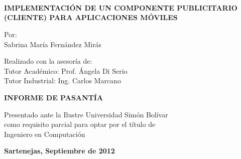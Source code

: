 \begin{center}
\par\end{center}

\noindent \begin{center}
\textbf{}\textbf{\noun{}}\\
\textbf{}\\
\textbf{}\noun{}\\
\bigskip{}
\bigskip{}
\bigskip{}
\bigskip{}
\bigskip{}
\bigskip{}
\bigskip{}
\bigskip{}
\bigskip{}
\bigskip{}

\par\end{center}

\noindent \begin{center}
\textbf{\large IMPLEMENTACIÓN DE UN COMPONENTE PUBLICITARIO (CLIENTE)
PARA APLICACIONES MÓVILES}
\par\end{center}{\large \par}

\bigskip{}
\bigskip{}
\bigskip{}
\bigskip{}
\bigskip{}


\begin{center}
Por:\\
Sabrina María Fernández Mirás
\par\end{center}

\bigskip{}
\bigskip{}
\bigskip{}


\begin{center}
Realizado con la asesoría de:\\
Tutor Académico: Prof. Ángela Di Serio\\
Tutor Industrial: Ing. Carlos Marcano
\par\end{center}

\bigskip{}
\bigskip{}
\bigskip{}
\bigskip{}
\bigskip{}
\bigskip{}
\bigskip{}


\begin{center}
\textbf{\large INFORME DE PASANTÍA}
\par\end{center}{\large \par}

\begin{center}
Presentado ante la Ilustre Universidad Simón Bolívar\\
como requisito parcial para optar por el título de\\
Ingeniero en Computación
\par\end{center}

\bigskip{}
\bigskip{}
\bigskip{}
\bigskip{}
\bigskip{}


\vfill{}


\begin{center}
\textbf{Sartenejas, Septiembre de 2012}
\par\end{center}
